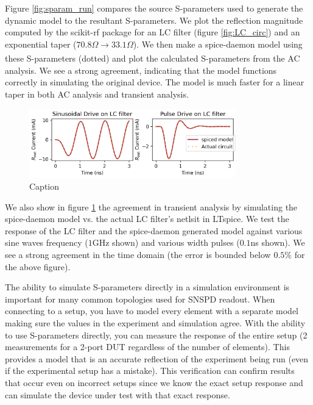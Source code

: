 \documentclass[]{article}
\newcommand{\cf}[1]{\textsf{#1}}
\begin{document}
Figure \ref{fig:sparam_run} compares the source S-parameters used to generate the dynamic
model to the resultant S-parameters. 
We plot the reflection magnitude computed by the \cf{scikit-rf} package for an LC
filter (figure \ref{fig:LC_circ}) and an exponential taper ($70.8\Omega \xrightarrow[]{} 33.1\Omega$).
We then make a spice-daemon model using these
S-parameters (dotted) and plot the calculated S-parameters from the AC analysis.
We see a strong agreement, indicating that the model
functions correctly in simulating the original device. The model is much faster for a linear 
taper in both AC analysis and transient analysis.

\begin{figure}
    \centering
    \includegraphics[width=0.8\textwidth]{figs/td_LC.png}
    \caption{Caption}
    \label{fig:td_sparam}
\end{figure}

We also show in figure \ref{fig:td_sparam} the agreement in transient analysis by
simulating the spice-daemon model vs. the actual LC filter's netlsit in LTspice.
We test the response of the LC filter and the spice-daemon generated model against
various sine waves frequency ($1$GHz shown) and various width pulses ($0.1$ns shown).
We see a strong agreement in the time domain (the error is bounded below $0.5\%$ for 
the above figure).

The ability to simulate S-parameters directly in a simulation environment is important
for many common topologies used for SNSPD readout. When connecting to a setup, you have to
model every element with a separate model making sure the values in the experiment and simulation
agree. With the ability to use S-parameters directly, you can measure the response of the entire setup
(2 measurements for a 2-port DUT regardless of the number of elements). 
This provides a model that is an accurate reflection of the experiment being 
run (even if the experimental setup has a mistake). This verification
can confirm results that occur even on incorrect setups since we know the exact setup response
and can simulate the device under test with that exact response. 
\end{document}

